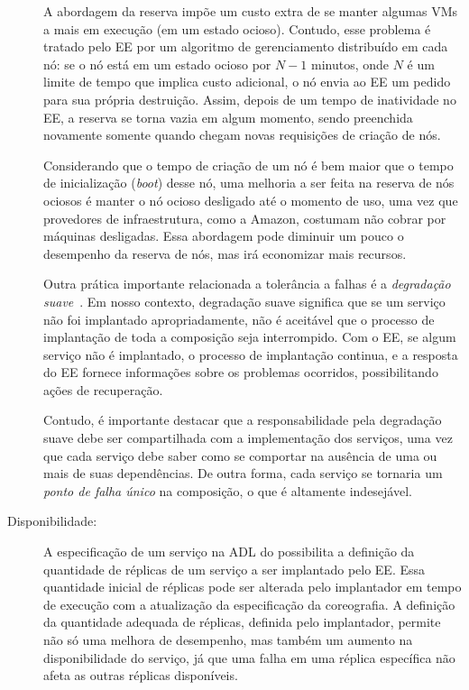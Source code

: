 \begin{description}
A abordagem da reserva impõe um custo extra de se manter algumas VMs a mais
em execução (em um estado ocioso). Contudo, esse problema é tratado
pelo EE por um algoritmo de gerenciamento distribuído em cada nó:
se o nó está em um estado ocioso por $N-1$ minutos, onde $N$ é um limite
de tempo que implica custo adicional, o nó envia ao EE um pedido para 
sua própria destruição. Assim, depois de um tempo de inatividade no EE,
a reserva se torna vazia em algum momento, sendo preenchida novamente
somente quando chegam novas requisições de criação de nós.

Considerando que o tempo de criação de um nó é bem maior que o tempo de inicialização (\emph{boot})
desse nó, uma melhoria a ser feita na reserva de nós ociosos é manter o nó ocioso desligado
até o momento de uso, uma vez que provedores de infraestrutura, como a Amazon,
costumam não cobrar por máquinas desligadas.
Essa abordagem pode diminuir um pouco o desempenho da reserva de nós,
mas irá economizar mais recursos.

Outra prática importante relacionada a tolerância a falhas é a 
\emph{degradação suave}~\cite{Brewer2001GiantScale,Hamilton2007InternetScale}.
Em nosso contexto, degradação suave significa que se um serviço não foi 
implantado apropriadamente, não é aceitável que o processo de implantação
de toda a composição seja interrompido.
Com o EE, se algum serviço não é implantado, o processo de implantação continua,
e a resposta do EE fornece informações sobre os problemas ocorridos,
possibilitando ações de recuperação.

Contudo, é importante destacar que a responsabilidade pela degradação suave
debe ser compartilhada com a implementação dos serviços, uma vez que cada serviço
debe saber como se comportar na ausência de uma ou mais de suas dependências.
De outra forma, cada serviço se tornaria um \emph{ponto de falha único} na composição,
o que é altamente indesejável.

\item [Disponibilidade:]

A especificação de um serviço na ADL do \ee possibilita a definição da quantidade de réplicas
de um serviço a ser implantado pelo EE.
Essa quantidade inicial de réplicas pode ser alterada pelo implantador em tempo de execução
com a atualização da especificação da coreografia.
A definição da quantidade adequada de réplicas, definida pelo implantador, permite não só uma melhora
de desempenho, mas também um aumento na disponibilidade do serviço, já que uma falha em uma réplica
específica não afeta as outras réplicas disponíveis.


\end{description}

